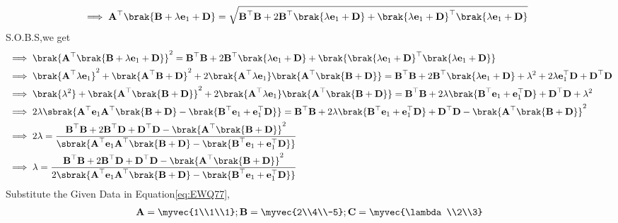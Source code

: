 \begin{enumerate}[label=\thesection.\arabic*,ref=\thesection.\theenumi]
\begin{align}
&\implies\vec{A}^{\top}\brak{\vec{B}+\lambda\vec{e}_1+\vec{D}}=\sqrt{\vec{B}^{\top}\vec{B}+2\vec{B}^{\top}\brak{\lambda\vec{e}_1+\vec{D}}+\brak{\lambda\vec{e}_1+\vec{D}}^{\top}\brak{\lambda\vec{e}_1+\vec{D}}}
\end{align}
S.O.B.S,we get
\begin{align}
&\implies\brak{\vec{A}^{\top}\brak{\vec{B}+\lambda\vec{e}_1+\vec{D}}}^{2}=\vec{B}^{\top}\vec{B}+2\vec{B}^{\top}\brak{\lambda\vec{e}_1+\vec{D}}+\brak{\brak{\lambda\vec{e}_1+\vec{D}}^{\top}\brak{\lambda\vec{e}_1+\vec{D}}} \\
&\implies\brak{\vec{A}^{\top}\lambda\vec{e}_1}^{2}+\brak{\vec{A}^{\top}\vec{B}+\vec{D}}^{2}+2\brak{\vec{A}^{\top}\lambda\vec{e}_1}\brak{\vec{A}^{\top}\brak{\vec{B}+\vec{D}}}=\vec{B}^{\top}\vec{B}+2\vec{B}^{\top}\brak{\lambda\vec{e}_1+\vec{D}}+\lambda^{2}+2\lambda\vec{e}_1^{\top}\vec{D}+\vec{D}^{\top}\vec{D}\\
&\implies\brak{\lambda^{2}}+\brak{\vec{A}^{\top}\brak{\vec{B}+\vec{D}}}^{2}+2\brak{\vec{A}^{\top}\lambda\vec{e}_1}\brak{\vec{A}^{\top}\brak{\vec{B}+\vec{D}}}=\vec{B}^{\top}\vec{B}+2\lambda\brak{\vec{B}^{\top}\vec{e}_1+\vec{e}_1^{\top}\vec{D}}+\vec{D}^{\top}\vec{D}+\lambda^{2}\\
&\implies2\lambda\sbrak{\vec{A}^\top\vec{e}_1\vec{A}^\top\brak{\vec{B}+\vec{D}}-\brak{\vec{B}^{\top}\vec{e}_1+\vec{e}_1^{\top}\vec{D}}}=\vec{B}^{\top}\vec{B}+2\lambda\brak{\vec{B}^{\top}\vec{e}_1+\vec{e}_1^{\top}\vec{D}}+\vec{D}^{\top}\vec{D}-\brak{\vec{A}^{\top}\brak{\vec{B}+\vec{D}}}^{2}\\
&\implies2\lambda=\frac{\vec{B}^{\top}\vec{B}+2\vec{B}^{\top}\vec{D}+\vec{D}^{\top}\vec{D}-\brak{\vec{A}^{\top}\brak{\vec{B}+\vec{D}}}^{2}}{\sbrak{\vec{A}^\top\vec{e}_1\vec{A}^\top\brak{\vec{B}+\vec{D}}-\brak{\vec{B}^{\top}\vec{e}_1+\vec{e}_1^{\top}\vec{D}}}}\\
&\implies\lambda=\frac{\vec{B}^{\top}\vec{B}+2\vec{B}^{\top}\vec{D}+\vec{D}^{\top}\vec{D}-\brak{\vec{A}^{\top}\brak{\vec{B}+\vec{D}}}^{2}}{2\sbrak{\vec{A}^\top\vec{e}_1\vec{A}^\top\brak{\vec{B}+\vec{D}}-\brak{\vec{B}^{\top}\vec{e}_1+\vec{e}_1^{\top}\vec{D}}}} \label{eq:EWQ77}
\end{align}
Substitute the Given Data in Equation\eqref{eq:EWQ77},
\begin{align*}
\vec{A}=\myvec{1\\1\\1};\vec{B}=\myvec{2\\4\\-5};\vec{C}=\myvec{\lambda\\2\\3}

\end{align*}
\end{enumerate}
